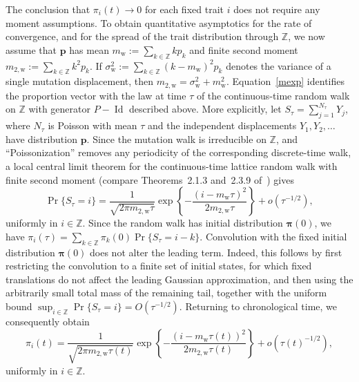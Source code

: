 \documentclass[12pt]{article}
\newcommand{\Z}{\ensuremath{\mathbb Z}}
\newcommand{\bp}{\boldsymbol{p}}
\newcommand{\bpi}{\boldsymbol{\pi}}
\newcommand{\Id}{\operatorname{Id}}
\newcommand{\mw}{m_{\text{w}}}
\newcommand{\vw}{m_{2,\text{w}}}
\newcommand{\sigmasquaredw}{\sigma^2_{\text{w}}}
\begin{document}
The conclusion that $\pi_i(t)\to 0$ for each fixed trait $i$ does not
require any moment assumptions. To obtain quantitative asymptotics for
the rate of convergence, and for the spread of the trait distribution
through $\Z$, we now assume that $\bp$ has mean $\mw:=\sum_{k\in\Z}kp_k$
and finite second moment $\vw:=\sum_{k\in\Z}k^2p_k$. If
$\sigmasquaredw:=\sum_{k\in\Z}(k-\mw)^2p_k$ denotes the variance of a
single mutation displacement, then $\vw=\sigmasquaredw+\mw^2$.
Equation~\eqref{mexp} identifies the proportion vector with the law at
time $\tau$ of the continuous-time random walk on $\Z$ with generator
$P-\Id$ described above. More explicitly, let
$S_\tau=\sum_{j=1}^{N_\tau}Y_j$, where $N_\tau$ is Poisson with mean
$\tau$ and the independent displacements $Y_1,Y_2,\ldots$ have
distribution $\bp$. 
Since the mutation walk is irreducible on $\Z$, and ``Poissonization''
removes any periodicity of the corresponding discrete-time walk, a local
central limit theorem for the continuous-time lattice random walk with
finite second moment (compare Theorems~2.1.3 and~2.3.9
of~\cite{LawlerLimic2010}) gives
$$
\Pr\{S_\tau=i\}
=
\frac{1}{\sqrt{2\pi\vw\tau}}
\exp\!\left\{
-\frac{(i-\mw\tau)^2}{2\vw\tau}
\right\}
+
o\!\left(\tau^{-1/2}\right),
$$
uniformly in $i\in\Z$. Since the random walk has initial distribution
$\bpi(0)$, we have $\pi_i(\tau) =
\sum_{k\in\Z}\pi_k(0)\Pr\{S_\tau=i-k\}$. Convolution with the fixed
initial distribution $\bpi(0)$ does not alter the leading term. Indeed,
this follows by first restricting the convolution to a finite set of
initial states, for which fixed translations do not affect the leading
Gaussian approximation, and then using the arbitrarily small total mass
of the remaining tail, together with the uniform bound
$\sup_{i\in\Z}\Pr\{S_\tau=i\}=O(\tau^{-1/2})$. Returning to
chronological time, we consequently obtain
$$
\pi_i(t)
=
\frac{1}{\sqrt{2\pi\vw\tau(t)}}
\exp\!\left\{
-\frac{(i-\mw\tau(t))^2}{2\vw\tau(t)}
\right\}
+
o\!\left(\tau(t)^{-1/2}\right),
$$
uniformly in $i\in\Z$.
\end{document}
